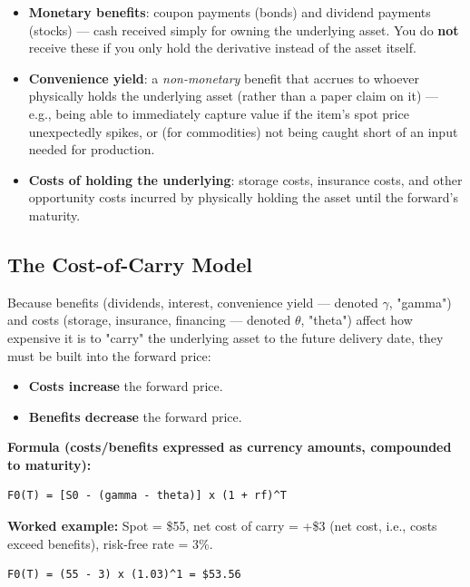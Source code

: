 \documentclass[12pt,openany]{book}
\theoremstyle{definition}
\theoremstyle{remark}
\begin{document}
\begin{itemize}
\item \textbf{Monetary benefits}: coupon payments (bonds) and dividend payments (stocks) — cash received simply for owning the underlying asset. You do \textbf{not} receive these if you only hold the derivative instead of the asset itself.
\item \textbf{Convenience yield}: a \emph{non-monetary} benefit that accrues to whoever physically holds the underlying asset (rather than a paper claim on it) — e.g., being able to immediately capture value if the item's spot price unexpectedly spikes, or (for commodities) not being caught short of an input needed for production.
\item \textbf{Costs of holding the underlying}: storage costs, insurance costs, and other opportunity costs incurred by physically holding the asset until the forward's maturity.
\end{itemize}
\subsection{The Cost-of-Carry Model}

Because benefits (dividends, interest, convenience yield — denoted \textbf{\ensuremath{\gamma}}, "gamma") and costs (storage, insurance, financing — denoted \textbf{\ensuremath{\theta}}, "theta") affect how expensive it is to "carry" the underlying asset to the future delivery date, they must be built into the forward price:

\begin{itemize}
\item \textbf{Costs increase} the forward price.
\item \textbf{Benefits decrease} the forward price.
\end{itemize}
\textbf{Formula (costs/benefits expressed as currency amounts, compounded to maturity):}

\begin{lstlisting}[style=notesCode]
F0(T) = [S0 - (gamma - theta)] x (1 + rf)^T
\end{lstlisting}

\textbf{Worked example:} Spot = \$55, net cost of carry = +\$3 (net cost, i.e., costs exceed benefits), risk-free rate = 3\%.

\begin{lstlisting}[style=notesCode]
F0(T) = (55 - 3) x (1.03)^1 = $53.56
\end{lstlisting}
\end{document}
